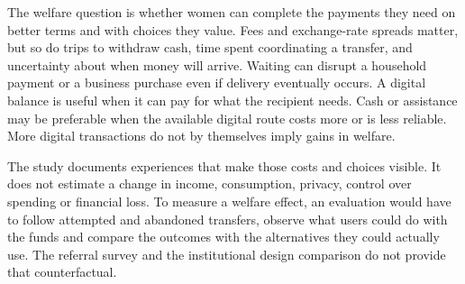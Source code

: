 The welfare question is whether women can complete the payments they need on better terms and with choices they value. Fees and exchange-rate spreads matter, but so do trips to withdraw cash, time spent coordinating a transfer, and uncertainty about when money will arrive. Waiting can disrupt a household payment or a business purchase even if delivery eventually occurs. A digital balance is useful when it can pay for what the recipient needs. Cash or assistance may be preferable when the available digital route costs more or is less reliable. More digital transactions do not by themselves imply gains in welfare.

The study documents experiences that make those costs and choices visible. It does not estimate a change in income, consumption, privacy, control over spending or financial loss. To measure a welfare effect, an evaluation would have to follow attempted and abandoned transfers, observe what users could do with the funds and compare the outcomes with the alternatives they could actually use. The referral survey and the institutional design comparison do not provide that counterfactual.
